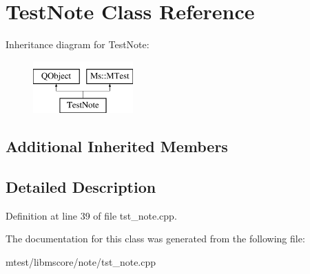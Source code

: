 \hypertarget{class_test_note}{}\section{Test\+Note Class Reference}
\label{class_test_note}
Inheritance diagram for Test\+Note\+:\begin{figure}[H]
\begin{center}
\leavevmode
\includegraphics[height=2.000000cm]{class_test_note}
\end{center}
\end{figure}
\subsection*{Additional Inherited Members}


\subsection{Detailed Description}


Definition at line 39 of file tst\+\_\+note.\+cpp.



The documentation for this class was generated from the following file\+:\begin{DoxyCompactItemize}
\item 
mtest/libmscore/note/tst\+\_\+note.\+cpp\end{DoxyCompactItemize}

